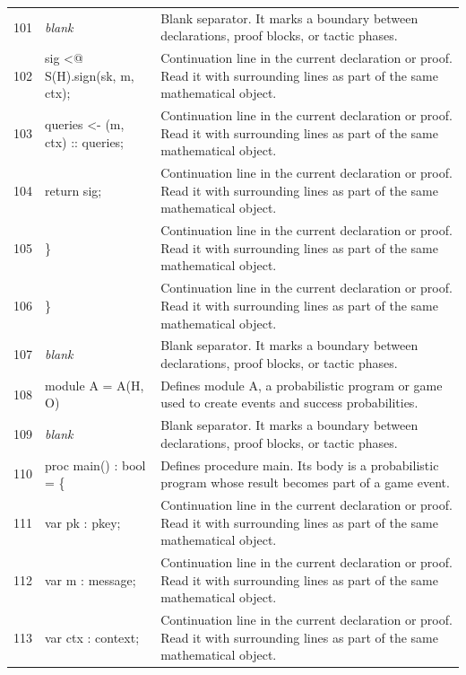 \documentclass[10pt]{article}
\begin{document}
\begin{longtable}{r L{0.53\textwidth} L{0.37\textwidth}}
101 & {\ttfamily\scriptsize \emph{blank}} & Blank separator.  It marks a boundary between declarations, proof blocks, or tactic phases. \\
102 & {\ttfamily\scriptsize       sig <@ S(H).sign(sk, m, ctx);} & Continuation line in the current declaration or proof.  Read it with surrounding lines as part of the same mathematical object. \\
103 & {\ttfamily\scriptsize       queries <- (m, ctx) :: queries;} & Continuation line in the current declaration or proof.  Read it with surrounding lines as part of the same mathematical object. \\
104 & {\ttfamily\scriptsize       return sig;} & Continuation line in the current declaration or proof.  Read it with surrounding lines as part of the same mathematical object. \\
105 & {\ttfamily\scriptsize     \}} & Continuation line in the current declaration or proof.  Read it with surrounding lines as part of the same mathematical object. \\
106 & {\ttfamily\scriptsize   \}} & Continuation line in the current declaration or proof.  Read it with surrounding lines as part of the same mathematical object. \\
107 & {\ttfamily\scriptsize \emph{blank}} & Blank separator.  It marks a boundary between declarations, proof blocks, or tactic phases. \\
108 & {\ttfamily\scriptsize   module A = A(H, O)} & Defines module A, a probabilistic program or game used to create events and success probabilities. \\
109 & {\ttfamily\scriptsize \emph{blank}} & Blank separator.  It marks a boundary between declarations, proof blocks, or tactic phases. \\
110 & {\ttfamily\scriptsize   proc main() : bool = \{} & Defines procedure main.  Its body is a probabilistic program whose result becomes part of a game event. \\
111 & {\ttfamily\scriptsize     var pk : pkey;} & Continuation line in the current declaration or proof.  Read it with surrounding lines as part of the same mathematical object. \\
112 & {\ttfamily\scriptsize     var m : message;} & Continuation line in the current declaration or proof.  Read it with surrounding lines as part of the same mathematical object. \\
113 & {\ttfamily\scriptsize     var ctx : context;} & Continuation line in the current declaration or proof.  Read it with surrounding lines as part of the same mathematical object. \\

\end{longtable}
\end{document}
